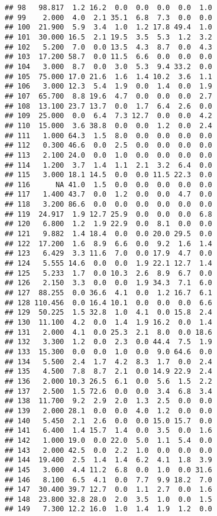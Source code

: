 \documentclass[
]{article}
\begin{document}
\begin{verbatim}
## 98   98.817  1.2 16.2  0.0  0.0  0.0  0.0  1.0
## 99    2.000  4.0  2.1 35.1  6.8  7.3  0.0  0.0
## 100  21.900  5.9  3.4  1.0  1.2 17.8 49.4  1.0
## 101  30.000 16.5  2.1 19.5  3.5  5.3  1.2  3.2
## 102   5.200  7.0  0.0 13.5  4.3  8.7  0.0  4.3
## 103  17.200 58.7  0.0 11.5  6.6  0.0  0.0  0.0
## 104   3.000  8.7  0.0  3.0  5.3  9.4 33.2  0.0
## 105  75.000 17.0 21.6  1.6  1.4 10.2  3.6  1.1
## 106   3.000 12.3  5.4  1.9  0.0  1.4  0.0  1.9
## 107  65.700  8.8 19.6  4.7  0.0  0.0  0.0  2.7
## 108  13.100 23.7 13.7  0.0  1.7  6.4  2.6  0.0
## 109  25.000  0.0  6.4  7.3 12.7  0.0  0.0  4.2
## 110  15.000  3.6 38.8  0.0  0.0  1.2  0.0  2.4
## 111   1.000 64.3  1.5  8.0  0.0  0.0  0.0  0.0
## 112   0.300 46.6  0.0  2.5  0.0  0.0  0.0  0.0
## 113   2.100 24.0  0.0  1.0  0.0  0.0  0.0  0.0
## 114   1.200  3.7  1.4  1.1  2.1  3.2  6.4  0.0
## 115   3.000 18.1 14.5  0.0  0.0 11.5 22.3  0.0
## 116      NA 41.0  1.5  0.0  0.0  0.0  0.0  0.0
## 117   1.400 43.7  0.0  1.2  0.0  0.0  4.7  0.0
## 118   3.200 86.6  0.0  0.0  0.0  0.0  0.0  0.0
## 119  24.917  1.9 12.7 25.9  0.0  0.0  0.0  6.8
## 120   6.800  1.2  1.9 22.9  0.0  8.1  0.0  0.0
## 121   9.882  1.4 18.4  0.0  0.0 20.0 29.5  0.0
## 122  17.200  1.6  8.9  6.6  0.0  9.2  1.6  1.4
## 123   6.429  3.3 11.6  7.0  0.0 17.9  4.7  0.0
## 124   5.555 14.6  0.0  0.0  1.9 22.1 12.7  1.4
## 125   5.233  1.7  0.0 10.3  2.6  8.9  6.7  0.0
## 126   2.150  3.3  0.0  0.0  1.9 34.3  7.1  6.0
## 127  88.255  0.0 36.6  4.1  0.0  1.2 16.7  6.1
## 128 110.456  0.0 16.4 10.1  0.0  0.0  0.0  6.6
## 129  50.225  1.5 32.8  1.0  4.1  0.0 15.8  2.4
## 130  11.100  4.2  0.0  1.4  1.9 16.2  0.0  1.4
## 131   2.000  4.1  0.0 25.3  2.1  8.0  0.0 18.6
## 132   3.300  1.2  0.0  2.3  0.0 44.4  7.5  1.9
## 133  15.300  0.0  0.0  1.0  0.0  9.0 64.6  0.0
## 134   5.500  2.4  1.7  4.2  8.3  1.7  0.0  2.4
## 135   4.500  7.8  8.7  2.1  0.0 14.9 22.9  2.4
## 136   2.000 10.3 26.5  6.1  0.0  5.6  1.5  2.2
## 137   2.500  1.5 72.6  0.0  0.0  3.4  6.8  3.4
## 138  11.700  9.2  2.9  2.0  1.3  2.5  0.0  0.0
## 139   2.000 28.1  0.0  0.0  4.0  1.2  0.0  0.0
## 140   5.450  2.1  2.6  0.0  0.0 15.0 15.7  0.0
## 141   6.400  1.4 15.7  1.4  0.0  3.5  0.0  1.6
## 142   1.000 19.0  0.0 22.0  5.0  1.1  5.4  0.0
## 143   2.000 42.5  0.0  2.2  1.0  0.0  0.0  0.0
## 144  19.400  2.5  1.4  1.4  6.2  4.1  1.8  3.9
## 145   3.000  4.4 11.2  6.8  0.0  1.0  0.0 31.6
## 146   8.100  6.5  4.1  0.0  7.7  9.9 18.2  7.0
## 147  30.400 39.7 12.7  0.0  1.1  2.7  0.0  1.6
## 148  23.800 32.8 28.0  2.0  3.5  1.0  0.0  1.5
## 149   7.300 12.2 16.0  1.0  1.4  1.9  1.2  0.0

\end{verbatim}
\end{document}
